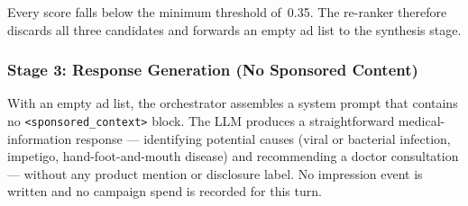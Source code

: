 \noindent
Every score falls below the minimum threshold of~0.35.  The re-ranker
therefore discards all three candidates and forwards an empty ad list to
the synthesis stage.

\subsubsection{Stage 3: Response Generation (No Sponsored Content)}
\label{subsubsec:example3-response}

With an empty ad list, the orchestrator assembles a system prompt that
contains no \texttt{<sponsored\_context>} block.  The LLM produces a
straightforward medical-information response --- identifying potential causes
(viral or bacterial infection, impetigo, hand-foot-and-mouth disease) and
recommending a doctor consultation --- without any product mention or
disclosure label.  No impression event is written and no campaign spend is
recorded for this turn.
